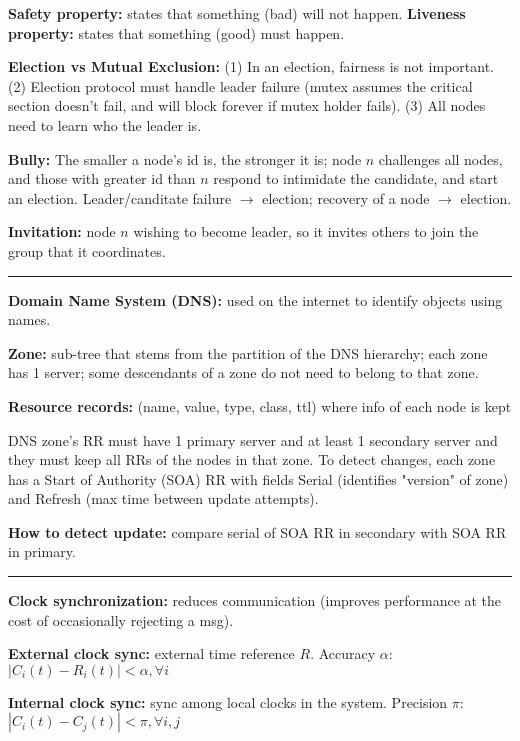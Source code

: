 \documentclass{form}
\begin{document}
\begin{multicols*}{2}
\textbf{Safety property:} states that something (bad) will not happen.
\textbf{Liveness property:} states that something (good) must happen.

\textbf{Election vs Mutual Exclusion:} (1) In an election, fairness is not important. (2) Election protocol must handle leader failure (mutex assumes the critical section doesn't fail, and will block forever if mutex holder fails). (3) All nodes need to learn who the leader is.

\textbf{Bully:} The smaller a node's id is, the stronger it is; node $n$ challenges all nodes, and those with greater id than $n$ respond to intimidate the candidate, and start an election. Leader/canditate failure $\rightarrow$ election; recovery of a node $\rightarrow$ election.

\textbf{Invitation:} node $n$ wishing to become leader, so it invites others to join the group that it coordinates.

\vspace{-1em}\rule{\linewidth}{0.4pt}

\textbf{Domain Name System (DNS):} used on the internet to identify objects using names.

\textbf{Zone:} sub-tree that stems from the partition of the DNS hierarchy; each zone has 1 server; some descendants of a zone do not need to belong to that zone.

\textbf{Resource records:} (name, value, type, class, ttl) where info of each node is kept

DNS zone's RR must have 1 primary server and at least 1 secondary server and they must keep all RRs of the nodes in that zone. To detect changes, each zone has a Start of Authority (SOA) RR with fields Serial (identifies "version" of zone) and Refresh (max time between update attempts).

\textbf{How to detect update:} compare serial of SOA RR in secondary with SOA RR in primary.

\vspace{-1em}\rule{\linewidth}{0.4pt}

\textbf{Clock synchronization:} reduces communication (improves performance at the cost of occasionally rejecting a msg).

\textbf{External clock sync:} external time reference $R$. Accuracy $\alpha$: $|C_i(t) - R_i(t)| < \alpha, \forall i$

\textbf{Internal clock sync:} sync among local clocks in the system. Precision $\pi$: $|C_i(t) - C_j(t)| < \pi, \forall i, j$


\end{multicols*}
\end{document}
